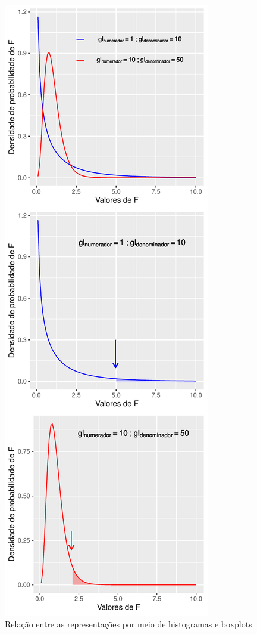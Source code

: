 \documentclass[
]{book}
\begin{document}
\begin{figure}

{\centering \includegraphics{probest-cambientais_files/figure-latex/unnamed-chunk-151-1} 

}

\caption{Relação entre as representações por meio de histogramas e boxplots}\label{fig:unnamed-chunk-151}
\end{figure}
\end{document}
